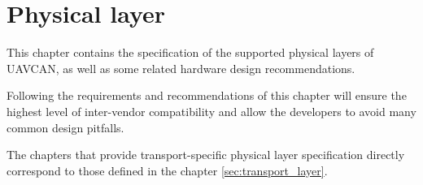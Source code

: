 \chapter{Physical layer}\label{sec:physical_layer}

This chapter contains the specification of the supported physical layers of UAVCAN,
as well as some related hardware design recommendations.

Following the requirements and recommendations of this chapter will ensure the highest level of
inter-vendor compatibility and allow the developers to avoid many common design pitfalls.

The chapters that provide transport-specific physical layer specification
directly correspond to those defined in the chapter \ref{sec:transport_layer}.

\clearpage
